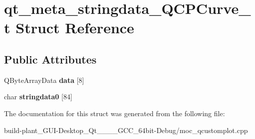 \hypertarget{structqt__meta__stringdata__QCPCurve__t}{}\section{qt\+\_\+meta\+\_\+stringdata\+\_\+\+Q\+C\+P\+Curve\+\_\+t Struct Reference}
\label{structqt__meta__stringdata__QCPCurve__t}
\subsection*{Public Attributes}
\begin{DoxyCompactItemize}
\item 
\mbox{\label{structqt__meta__stringdata__QCPCurve__t_a7398cd60d68a5b116f4a9337e17df11d}} 
Q\+Byte\+Array\+Data {\bfseries data} \mbox{[}8\mbox{]}
\item 
\mbox{\label{structqt__meta__stringdata__QCPCurve__t_a48e3deecb80ff42a459075e2246e712f}} 
char {\bfseries stringdata0} \mbox{[}84\mbox{]}
\end{DoxyCompactItemize}


The documentation for this struct was generated from the following file\+:\begin{DoxyCompactItemize}
\item 
build-\/plant\+\_\+\+G\+U\+I-\/\+Desktop\+\_\+\+Qt\+\_\+\_\+\_\+\_\+\+G\+C\+C\+\_\+64bit-\/\+Debug/moc\+\_\+qcustomplot.\+cpp\end{DoxyCompactItemize}

